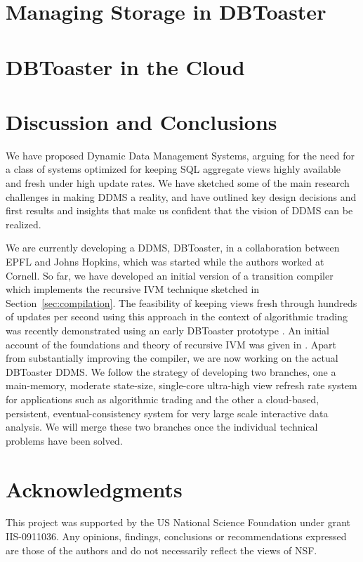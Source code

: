 \documentclass{sig-alternate}
\begin{document}
\section{Managing Storage in DBToaster}
\label{sec:storage}



\section{DBToaster in the Cloud}
\label{sec:distribution}


\section{Discussion and Conclusions}
We have proposed Dynamic Data Management Systems,
arguing for the need for a class of systems optimized
for keeping SQL aggregate views highly available and fresh under
high update rates.
We have sketched some of the main research challenges in
making DDMS a reality, and have outlined key design decisions
and first results and insights that make us confident that
the vision of DDMS can be realized.

We are currently developing a DDMS, DBToaster, in a collaboration
between EPFL and Johns Hopkins, which was started while the
authors worked at Cornell.
%
So far, we have developed an initial version of a
transition compiler which implements the recursive IVM technique
sketched in Section~\ref{sec:compilation}. The feasibility of
keeping views fresh through hundreds of updates per second using
this approach in the context of algorithmic trading
was recently demonstrated using an early DBToaster prototype
\cite{ahmad-vldb:09}. An initial account of the foundations and
theory of recursive IVM was given in \cite{koch-pods:10}.
Apart from substantially improving the compiler,
we are now working on the actual DBToaster DDMS. We follow the
strategy of developing two branches, one a main-memory, moderate
state-size, single-core ultra-high view refresh rate system for
applications such as algorithmic trading and the other
a cloud-based, persistent, eventual-consistency system for
very large scale interactive data analysis. We will
merge these two branches once the individual technical
problems have been solved.


\section*{Acknowledgments}


This project was supported by the US National Science Foundation under
grant IIS-0911036.
Any opinions, findings, conclusions or recommendations expressed are those of the authors and do not necessarily reflect the views of NSF.




\end{document}
